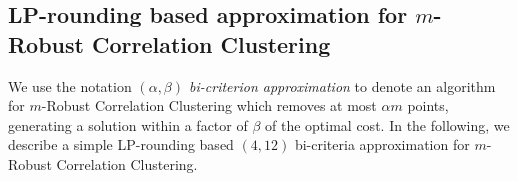 



\subsection{LP-rounding based approximation for $m$-Robust Correlation Clustering}

We use the notation \textit{$(\alpha, \beta)$ bi-criterion approximation} to denote an algorithm for $m$-Robust Correlation Clustering which removes at most $\alpha m$ points, generating a solution within a factor of $\beta$ of the optimal cost. In the following, we describe a simple LP-rounding based $(4,12)$ bi-criteria approximation for $m$-Robust Correlation Clustering.


